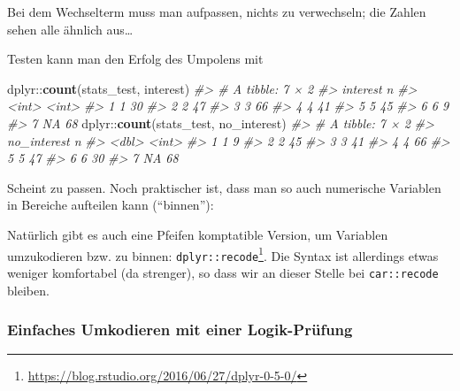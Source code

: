 \documentclass[12pt,ngerman,]{book}
\newenvironment{Shaded}{\begin{snugshade}}{\end{snugshade}}
\newcommand{\KeywordTok}[1]{\textcolor[rgb]{0.13,0.29,0.53}{\textbf{{#1}}}}
\newcommand{\StringTok}[1]{\textcolor[rgb]{0.31,0.60,0.02}{{#1}}}
\newcommand{\CommentTok}[1]{\textcolor[rgb]{0.56,0.35,0.01}{\textit{{#1}}}}
\newcommand{\NormalTok}[1]{{#1}}
\let\rmarkdownfootnote\footnote%
\def\footnote{\protect\rmarkdownfootnote}
\renewenvironment{Shaded}{\begin{kframe}}{\end{kframe}}
\begin{document}
Bei dem Wechselterm muss man aufpassen, nichts zu verwechseln; die
Zahlen sehen alle ähnlich aus\ldots{}

Testen kann man den Erfolg des Umpolens mit

\begin{Shaded}
\begin{Highlighting}[]
\NormalTok{dplyr::}\KeywordTok{count}\NormalTok{(stats_test, interest)}
\CommentTok{#> # A tibble: 7 × 2}
\CommentTok{#>   interest     n}
\CommentTok{#>      <int> <int>}
\CommentTok{#> 1        1    30}
\CommentTok{#> 2        2    47}
\CommentTok{#> 3        3    66}
\CommentTok{#> 4        4    41}
\CommentTok{#> 5        5    45}
\CommentTok{#> 6        6     9}
\CommentTok{#> 7       NA    68}
\NormalTok{dplyr::}\KeywordTok{count}\NormalTok{(stats_test, no_interest)}
\CommentTok{#> # A tibble: 7 × 2}
\CommentTok{#>   no_interest     n}
\CommentTok{#>         <dbl> <int>}
\CommentTok{#> 1           1     9}
\CommentTok{#> 2           2    45}
\CommentTok{#> 3           3    41}
\CommentTok{#> 4           4    66}
\CommentTok{#> 5           5    47}
\CommentTok{#> 6           6    30}
\CommentTok{#> 7          NA    68}
\end{Highlighting}
\end{Shaded}

Scheint zu passen. Noch praktischer ist, dass man so auch numerische
Variablen in Bereiche aufteilen kann (``binnen''):

\begin{Shaded}
\end{Shaded}

Natürlich gibt es auch eine Pfeifen komptatible Version, um Variablen
umzukodieren bzw. zu binnen: \texttt{dplyr::recode}\footnote{\url{https://blog.rstudio.org/2016/06/27/dplyr-0-5-0/}}.
Die Syntax ist allerdings etwas weniger komfortabel (da strenger), so
dass wir an dieser Stelle bei \texttt{car::recode} bleiben.

\subsubsection{Einfaches Umkodieren mit einer
Logik-Prüfung}\label{einfaches-umkodieren-mit-einer-logik-prufung}
\end{document}
